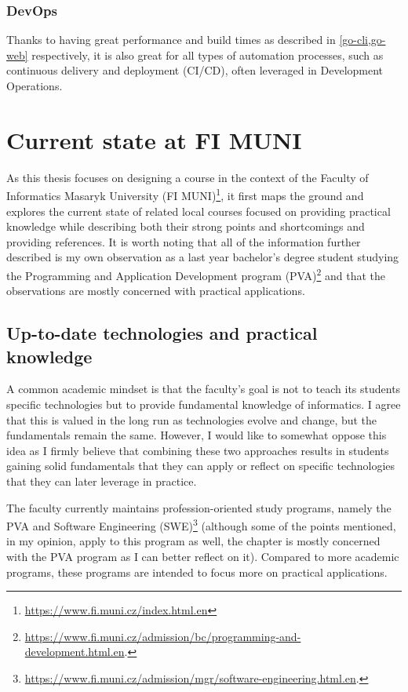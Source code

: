 \documentclass[
  digital,
  color,
  oneside,
  nosansbold,
  nocolorbold,
  nolof,
  nolot,
]{fithesis4}
\begin{document}
\subsection{DevOps}

Thanks to having great performance and build times as described in \cref{go-cli,go-web} respectively, it is also great for all types of automation processes, such as continuous delivery and deployment (CI/CD), often leveraged in Development Operations. \cite{go-devops}

\chapter{Current state at FI MUNI}\label{chapter-state}

As this thesis focuses on designing a course in the context of the Faculty of Informatics Masaryk University (FI MUNI)\footnote{\url{https://www.fi.muni.cz/index.html.en}}, it first maps the ground and explores the current state of related local courses focused on providing practical knowledge while describing both their strong points and shortcomings and providing references. It is worth noting that all of the information further described is my own observation as a last year bachelor's degree student studying the Programming and Application Development program (PVA)\footnote{\url{https://www.fi.muni.cz/admission/bc/programming-and-development.html.en}.} and that the observations are mostly concerned with practical applications.

\section{Up-to-date technologies and practical knowledge}

A common academic mindset is that the faculty's goal is not to teach its students specific technologies but to provide fundamental knowledge of informatics. I agree that this is valued in the long run as technologies evolve and change, but the fundamentals remain the same. However, I would like to somewhat oppose this idea as I firmly believe that combining these two approaches results in students gaining solid fundamentals that they can apply or reflect on specific technologies that they can later leverage in practice.

The faculty currently maintains profession-oriented study programs, namely the PVA and Software Engineering (SWE)\footnote{\url{https://www.fi.muni.cz/admission/mgr/software-engineering.html.en}.} (although some of the points mentioned, in my opinion, apply to this program as well, the chapter is mostly concerned with the PVA program as I can better reflect on it). Compared to more academic programs, these programs are intended to focus more on practical applications.
\end{document}
